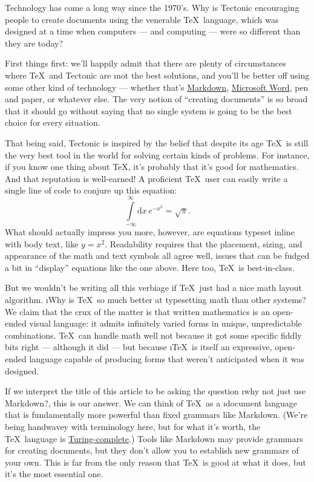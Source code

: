 
Technology has come a long way since the 1970's. Why is Tectonic encouraging
people to create documents using the venerable \TeX\ language, which was
designed at a time when computers — and computing — were so different than they
are today?

First things first: we'll happily admit that there are plenty of circumstances
where \TeX\ and Tectonic are \i{not} the best solutions, and you'll be better off
using some other kind of technology — whether that's
\href{https://en.wikipedia.org/wiki/Markdown}{Markdown},
\href{https://www.microsoft.com/en-us/microsoft-365/word}{Microsoft Word}, pen
and paper, or whatever else. The very notion of “creating documents” is so broad
that it should go without saying that no single system is going to be the best
choice for every situation.

That being said, Tectonic is inspired by the belief that despite its age \TeX\
is still the very best tool in the world for solving certain kinds of problems.
For instance, if you know one thing about \TeX, it's probably that it's good for
mathematics. And that reputation is well-earned! A proficient \TeX\ user can
easily write a single line of code to conjure up this equation:
\[
\int\limits_{-\infty}^{\infty} \text{d}x \, e^{-x^{2}} = \sqrt{\pi}.
\]
What should actually impress you more, however, are equations typeset inline
with body text, like $y = x^2$. Readability requires that the placement, sizing,
and appearance of the math and text symbols all agree well, issues that can be
fudged a bit in “display” equations like the one above. Here too, \TeX\ is
best-in-class.

But we wouldn't be writing all this verbiage if \TeX\ just had a nice math
layout algorithm. \i{Why} is \TeX\ so much better at typesetting math than other
systems? We claim that the crux of the matter is that written mathematics is an
open-ended visual language: it admits infinitely varied forms in unique,
unpredictable combinations. \TeX\ can handle math well not because it got some
specific fiddly bits right — although it did — but because \i{\TeX\ is itself an
expressive, open-ended language} capable of producing forms that weren't
anticipated when it was designed.

If we interpret the title of this article to be asking the question \i{why not
just use Markdown?}, this is our answer. We can think of \TeX\ as a \i{document
language} that is fundamentally more powerful than fixed grammars like Markdown.
(We're being handwavey with terminology here, but for what it's worth, the \TeX\
language is
\href{https://en.wikipedia.org/wiki/Turing_completeness}{Turing-complete}.)
Tools like Markdown may provide grammars for creating documents, but they don't
allow you to establish new grammars of your own. This is far from the only
reason that \TeX\ is good at what it does, but it's the most essential one.

